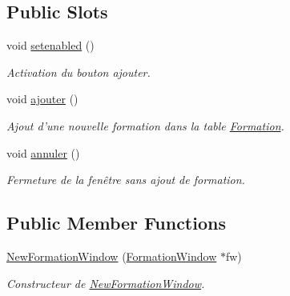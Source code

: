 \subsection*{Public Slots}
\begin{DoxyCompactItemize}
\item 
void \hyperlink{class_new_formation_window_a66635e5ac130cab09c7e356e7f660f28}{setenabled} ()
\begin{DoxyCompactList}\small\item\em Activation du bouton ajouter. \end{DoxyCompactList}\item 
\hypertarget{class_new_formation_window_a8b9f4f31f77835e98c3a07fdaf5fc4fe}{void \hyperlink{class_new_formation_window_a8b9f4f31f77835e98c3a07fdaf5fc4fe}{ajouter} ()}\label{class_new_formation_window_a8b9f4f31f77835e98c3a07fdaf5fc4fe}

\begin{DoxyCompactList}\small\item\em Ajout d'une nouvelle formation dans la table \hyperlink{class_formation}{Formation}. \end{DoxyCompactList}\item 
\hypertarget{class_new_formation_window_aa1bee2b0401c7b3d6717022562eace9c}{void \hyperlink{class_new_formation_window_aa1bee2b0401c7b3d6717022562eace9c}{annuler} ()}\label{class_new_formation_window_aa1bee2b0401c7b3d6717022562eace9c}

\begin{DoxyCompactList}\small\item\em Fermeture de la fenêtre sans ajout de formation. \end{DoxyCompactList}\end{DoxyCompactItemize}
\subsection*{Public Member Functions}
\begin{DoxyCompactItemize}
\item 
\hypertarget{class_new_formation_window_acc9ad7964db8df72b01d628622bc8d24}{\hyperlink{class_new_formation_window_acc9ad7964db8df72b01d628622bc8d24}{New\-Formation\-Window} (\hyperlink{class_formation_window}{Formation\-Window} $\ast$fw)}\label{class_new_formation_window_acc9ad7964db8df72b01d628622bc8d24}

\begin{DoxyCompactList}\small\item\em Constructeur de \hyperlink{class_new_formation_window}{New\-Formation\-Window}. \end{DoxyCompactList}\end{DoxyCompactItemize}
